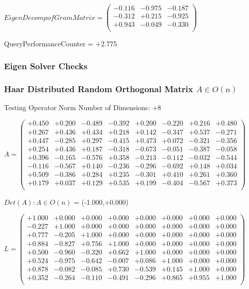 \documentclass[9pt]{article}
\theoremstyle{plain}
\theoremstyle{definition}
\theoremstyle{remark}
\numberwithin{equation}{section}
\begin{document}
$EigenDecomp of Gram Matrix = \left(
\begin{array}{
ccc}
-0.116 & -0.975 & -0.187 \\
-0.312 & +0.215 & -0.925 \\
+0.943 & -0.049 & -0.330 \\
\end{array}
\right)$ \newline 

QueryPerformanceCounter  =  +2.775
\subsubsection{Eigen Solver Checks}
\subsubsection{Haar Distributed Random Orthogonal Matrix $A \in O(n)$}
 Testing Operator Norm
Number of Dimensions: +8

$A = \left(
\begin{array}{
cccccccc}
+0.450 & +0.200 & -0.489 & -0.392 & +0.200 & -0.220 & +0.216 & +0.480 \\
+0.267 & +0.436 & +0.434 & +0.218 & +0.142 & -0.347 & +0.537 & -0.271 \\
+0.447 & -0.285 & +0.297 & -0.415 & +0.473 & +0.072 & -0.321 & -0.356 \\
+0.254 & +0.436 & +0.187 & -0.318 & -0.673 & -0.051 & -0.387 & -0.058 \\
+0.396 & -0.165 & -0.576 & +0.358 & -0.213 & -0.112 & -0.032 & -0.544 \\
-0.116 & -0.567 & +0.140 & -0.236 & -0.296 & -0.692 & +0.148 & +0.034 \\
+0.509 & -0.386 & +0.284 & +0.235 & -0.301 & +0.410 & +0.261 & +0.360 \\
+0.179 & +0.037 & +0.129 & +0.535 & +0.199 & -0.404 & -0.567 & +0.373 \\
\end{array}
\right)$ \newline 

$Det(A) :   A \in O(n)$ = (-1.000,+0.000)

$L = \left(
\begin{array}{
cccccccc}
+1.000 & +0.000 & +0.000 & +0.000 & +0.000 & +0.000 & +0.000 & +0.000 \\
-0.227 & +1.000 & +0.000 & +0.000 & +0.000 & +0.000 & +0.000 & +0.000 \\
+0.777 & -0.205 & +1.000 & +0.000 & +0.000 & +0.000 & +0.000 & +0.000 \\
+0.884 & -0.827 & +0.756 & +1.000 & +0.000 & +0.000 & +0.000 & +0.000 \\
+0.500 & -0.960 & -0.320 & +0.662 & +1.000 & +0.000 & +0.000 & +0.000 \\
+0.524 & -0.975 & -0.642 & -0.007 & +0.086 & +1.000 & +0.000 & +0.000 \\
+0.878 & -0.082 & -0.085 & +0.730 & -0.539 & +0.145 & +1.000 & +0.000 \\
+0.352 & -0.264 & -0.110 & -0.491 & -0.296 & +0.865 & +0.955 & +1.000 \\
\end{array}
\right)$ \newline 
\end{document}
